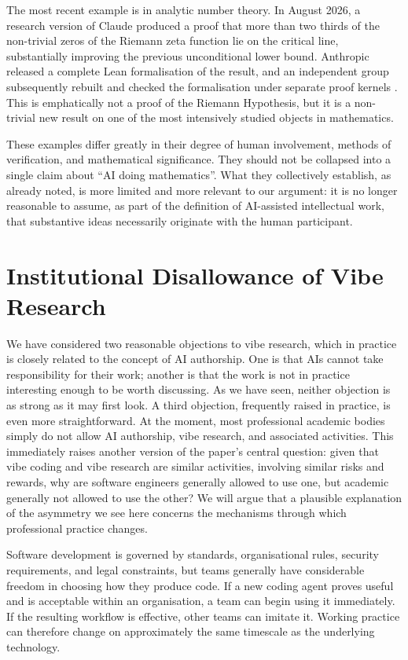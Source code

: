\documentclass[12pt]{article}
\begin{document}
The most recent example is in analytic number theory. In August 2026, a research version of Claude produced a proof that more than two thirds of the non-trivial zeros of the Riemann zeta function lie on the critical line, substantially improving the previous unconditional lower bound. Anthropic released a complete Lean formalisation of the result, and an independent group subsequently rebuilt and checked the formalisation under separate proof kernels \citep{claude2026zeta,riemannlabs2026zeta}. This is emphatically not a proof of the Riemann Hypothesis, but it is a non-trivial new result on one of the most intensively studied objects in mathematics.

These examples differ greatly in their degree of human involvement, methods of verification, and mathematical significance. They should not be collapsed into a single claim about ``AI doing mathematics''. What they collectively establish, as already noted, is more limited and more relevant to our argument: it is no longer reasonable to assume, as part of the definition of AI-assisted intellectual work, that substantive ideas necessarily originate with the human participant.

\section{Institutional Disallowance of Vibe Research}

We have considered two reasonable objections to vibe research, which in practice is closely related to the concept of AI authorship. One is that AIs cannot take responsibility for their work; another is that the work is not in practice interesting enough to be worth discussing. As we have seen, neither objection is as strong as it may first look. A third objection, frequently raised in practice, is even more straightforward. At the moment, most professional academic bodies simply do not allow AI authorship, vibe research, and associated activities. This immediately raises another version of the paper's central question: given that vibe coding and vibe research are similar activities, involving similar risks and rewards, why are software engineers generally allowed to use one, but academic generally not allowed to use the other? We will argue that 
a plausible explanation of the asymmetry we see here concerns the mechanisms through which professional practice changes.

Software development is governed by standards, organisational rules, security requirements, and legal constraints, but teams generally have considerable freedom in choosing how they produce code. If a new coding agent proves useful and is acceptable within an organisation, a team can begin using it immediately. If the resulting workflow is effective, other teams can imitate it. Working practice can therefore change on approximately the same timescale as the underlying technology.
\end{document}

